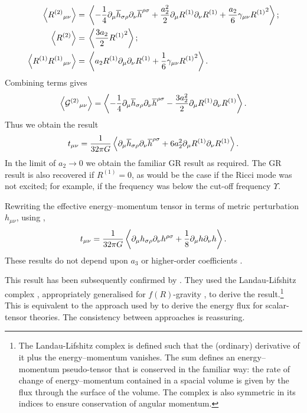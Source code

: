 \begin{subequations}
\begin{align}
\left\langle {R^{(2)}}_{\mu\nu} \right\rangle = {} & \left\langle -\dfrac{1}{4} \partial_\mu\overline{h}_{\sigma\rho}\partial_\nu\overline{h}^{\rho\sigma} + \dfrac{a_2^2}{2}\partial_\mu R^{(1)}\partial_\nu R^{(1)} + \dfrac{a_2}{6}\gamma_{\mu\nu} {R^{(1)}}^2 \right\rangle; \\
\left\langle R^{(2)} \right\rangle = {} & \left\langle \dfrac{3a_2}{2}{R^{(1)}}^2 \right\rangle; \\
\left\langle R^{(1)}{R^{(1)}}_{\mu\nu} \right\rangle = {} & \left\langle a_2 R^{(1)} \partial_\mu\partial_\nu R^{(1)} + \dfrac{1}{6}\gamma_{\mu\nu}{R^{(1)}}^2\right\rangle.
\end{align}
\end{subequations}
Combining terms gives
\begin{equation}
\left\langle {\mathcal{G}^{(2)}}_{\mu\nu}\right\rangle = \left\langle -\dfrac{1}{4} \partial_\mu\overline{h}_{\sigma\rho}\partial_\nu\overline{h}^{\rho\sigma} - \dfrac{3a_2^2}{2}\partial_\mu R^{(1)}\partial_\nu R^{(1)} \right\rangle.
\end{equation}
Thus we obtain the result
\begin{equation}
t_{\mu\nu} = \dfrac{1}{32\pi G}\left\langle \partial_\mu\overline{h}_{\sigma\rho}\partial_\nu\overline{h}^{\rho\sigma} + 6a_2^2\partial_\mu R^{(1)}\partial_\nu R^{(1)} \right\rangle.
\label{eq:Pseudotensor}
\end{equation}
In the limit of $a_2 \rightarrow 0$ we obtain the familiar GR result as required. The GR result is also recovered if $R^{(1)} = 0$, as would be the case if the Ricci mode was not excited; for example, if the frequency was below the cut-off frequency $\Upsilon$.

Rewriting the effective energy--momentum tensor in terms of metric perturbation $h_{\mu\nu}$, using ,
\begin{equation}
t_{\mu\nu} = \dfrac{1}{32\pi G}\left\langle \partial_\mu h_{\sigma\rho}\partial_\nu h^{\rho\sigma} + \dfrac{1}{8}\partial_\mu h \partial_\nu h \right\rangle.
\end{equation}
These results do not depend upon $a_3$ or higher-order coefficients \citep{Stein2011}.

This result has been subsequently confirmed by \citet{Naf2011}. They used the Landau-Lifshitz complex \citep[section 94]{Landau1975}, appropriately generalised for $f(R)$-gravity \citep{Nutku1969}, to derive the result.\footnote{The Landau-Lifshitz complex is defined such that the (ordinary) derivative of it plus the energy--momentum vanishes. The sum defines an energy--momentum pseudo-tensor that is conserved in the familiar way: the rate of change of energy--momentum contained in a spacial volume is given by the flux through the surface of the volume. The complex is also symmetric in its indices to ensure conservation of angular momentum.} This is equivalent to the approach used by \citet[section 10.3]{Will1993} to derive the energy flux for scalar-tensor theories. The consistency between approaches is reassuring.

